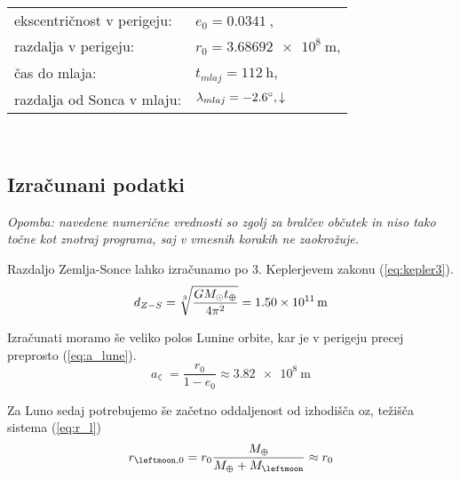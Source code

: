 \documentclass{article}
\begin{document}
\begin{tabular}{@{$\bullet$\quad}ll}
    ekscentričnost v perigeju\cite{NASA:Lunar_orbit}: & $e_0=\SI{0,0341}{}$,\\
    razdalja v perigeju\cite{apsid_calc}: & $r_0=\SI{3,68692e8}{\meter}$,\\
    čas do mlaja\cite{apsid_calc}: & $t_{mlaj}=\SI{112}{\hour}$,\\
    razdalja od Sonca v mlaju\footnotemark[1]: & $\lambda_{mlaj}=\ang{-2,6}, \xdownarrow{3 pt}$
\end{tabular}\\

\subsection{Izračunani podatki}
\label{sec:izr_pod}
\textit{Opomba: navedene numerične vrednosti so zgolj za bralčev občutek in niso tako točne kot znotraj programa, saj v vmesnih korakih ne zaokrožuje.}

Razdaljo Zemlja-Sonce lahko izračunamo po 3. Keplerjevem zakonu (\ref{eq:kepler3}).
\begin{equation}
    d_{Z-S}=\sqrt[3]{\frac{GM_\odot t_\varoplus}{4\pi^2}}=\SI{1,50e11}{\meter}
    \label{eq:kepler3}
\end{equation}

Izračunati moramo še veliko polos Lunine orbite, kar je v perigeju precej preprosto (\ref{eq:a_lune}).
\begin{equation}\label{eq:a_lune}
    a_\leftmoon=\frac{r_0}{1-e_0}\approx\SI{3,82e8}{\meter}
\end{equation}

Za Luno sedaj potrebujemo še začetno oddaljenost od izhodišča oz, težišča sistema (\ref{eq:r_l})
\begin{equation}\label{eq:r_l}
    r_{\leftmoon, 0}=r_0\frac{M_\varoplus}{M_\varoplus+M_\leftmoon}\approx r_0
\end{equation}
\end{document}

